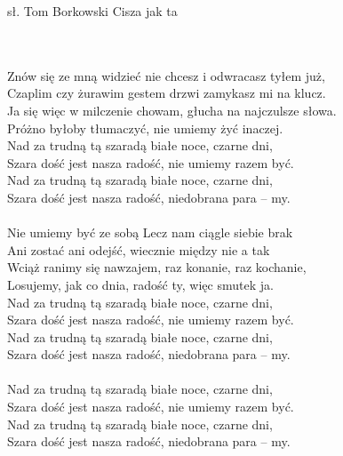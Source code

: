 {sł. Tom Borkowski}
{Cisza jak ta}
\begin{text}
\vin \\
\vin \\
Znów się ze mną widzieć nie chcesz i odwracasz tyłem już,\\
Czaplim czy żurawim gestem drzwi zamykasz mi na klucz.\\
Ja się więc w milczenie chowam, głucha na najczulsze słowa.\\
Próżno byłoby tłumaczyć, nie umiemy żyć inaczej.\\

\vin Nad za trudną tą szaradą białe noce, czarne dni,\\
\vin Szara dość jest nasza radość, nie umiemy razem być.\\
\vin Nad za trudną tą szaradą białe noce, czarne dni,\\
\vin Szara dość jest nasza radość, niedobrana para – my.\\
\vin \\

Nie umiemy być ze sobą Lecz nam ciągle siebie brak\\
Ani zostać ani odejść, wiecznie między nie a tak\\
Wciąż ranimy się nawzajem, raz konanie, raz kochanie,\\
Losujemy, jak co dnia, radość ty, więc smutek ja.\\

\vin Nad za trudną tą szaradą białe noce, czarne dni,\\
\vin Szara dość jest nasza radość, nie umiemy razem być.\\
\vin Nad za trudną tą szaradą białe noce, czarne dni,\\
\vin Szara dość jest nasza radość, niedobrana para – my.\\
\vin \\

\vin Nad za trudną tą szaradą białe noce, czarne dni,\\
\vin Szara dość jest nasza radość, nie umiemy razem być.\\
\vin Nad za trudną tą szaradą białe noce, czarne dni,\\
\vin Szara dość jest nasza radość, niedobrana para – my.\\
\vin \\
\end{text}
